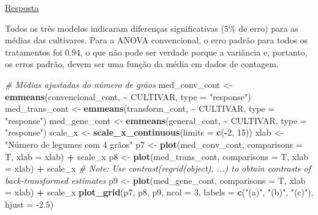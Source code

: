 \documentclass[
]{book}
\newenvironment{Shaded}{\begin{snugshade}}{\end{snugshade}}
\newcommand{\CommentTok}[1]{\textcolor[rgb]{0.56,0.35,0.01}{\textit{#1}}}
\newcommand{\DataTypeTok}[1]{\textcolor[rgb]{0.13,0.29,0.53}{#1}}
\newcommand{\DecValTok}[1]{\textcolor[rgb]{0.00,0.00,0.81}{#1}}
\newcommand{\FloatTok}[1]{\textcolor[rgb]{0.00,0.00,0.81}{#1}}
\newcommand{\KeywordTok}[1]{\textcolor[rgb]{0.13,0.29,0.53}{\textbf{#1}}}
\newcommand{\NormalTok}[1]{#1}
\newcommand{\OperatorTok}[1]{\textcolor[rgb]{0.81,0.36,0.00}{\textbf{#1}}}
\newcommand{\StringTok}[1]{\textcolor[rgb]{0.31,0.60,0.02}{#1}}
\numberwithin{equation}{section}
\newcommand{\indt}[1]{\index{#1|ST}}
\begin{document}
\protect\hyperlink{exerc10}{Resposta}

Todos os três modelos indicaram diferenças significativas (5\% de erro) para as médias das cultivares. Para a ANOVA\indt{ANOVA} convencional, o erro padrão para todos os tratamentos foi 0.94, o que não pode ser verdade porque a variância e, portanto, os erros padrão, devem ser uma função da média em dados de contagem.

\begin{Shaded}
\begin{Highlighting}[]

\CommentTok{\# Médias ajustadas do número de grãos}
\NormalTok{med\_conv\_cont \textless{}{-}}\StringTok{ }\KeywordTok{emmeans}\NormalTok{(convencional\_cont, }\OperatorTok{\textasciitilde{}}\StringTok{ }\NormalTok{CULTIVAR, }\DataTypeTok{type =} \StringTok{"response"}\NormalTok{)}
\NormalTok{med\_trans\_cont \textless{}{-}}\StringTok{ }\KeywordTok{emmeans}\NormalTok{(transform\_cont, }\OperatorTok{\textasciitilde{}}\StringTok{ }\NormalTok{CULTIVAR, }\DataTypeTok{type =} \StringTok{"response"}\NormalTok{)}
\NormalTok{med\_gene\_cont \textless{}{-}}\StringTok{ }\KeywordTok{emmeans}\NormalTok{(general\_cont, }\OperatorTok{\textasciitilde{}}\StringTok{ }\NormalTok{CULTIVAR, }\DataTypeTok{type =} \StringTok{"response"}\NormalTok{)}
\NormalTok{scale\_x \textless{}{-}}\StringTok{ }\KeywordTok{scale\_x\_continuous}\NormalTok{(}\DataTypeTok{limits =} \KeywordTok{c}\NormalTok{(}\OperatorTok{{-}}\DecValTok{2}\NormalTok{, }\DecValTok{15}\NormalTok{))}
\NormalTok{xlab \textless{}{-}}\StringTok{ "Número de legumes com 4 grãos"}
\NormalTok{p7 \textless{}{-}}\StringTok{ }\KeywordTok{plot}\NormalTok{(med\_conv\_cont, }\DataTypeTok{comparisons =}\NormalTok{ T, }\DataTypeTok{xlab =}\NormalTok{ xlab) }\OperatorTok{+}\StringTok{ }\NormalTok{scale\_x}
\NormalTok{p8 \textless{}{-}}\StringTok{ }\KeywordTok{plot}\NormalTok{(med\_trans\_cont, }\DataTypeTok{comparisons =}\NormalTok{ T, }\DataTypeTok{xlab =}\NormalTok{ xlab) }\OperatorTok{+}\StringTok{ }\NormalTok{scale\_x}
\CommentTok{\# Note: Use \textquotesingle{}contrast(regrid(object), ...)\textquotesingle{} to obtain contrasts of back{-}transformed estimates}
\NormalTok{p9 \textless{}{-}}\StringTok{ }\KeywordTok{plot}\NormalTok{(med\_gene\_cont, }\DataTypeTok{comparisons =}\NormalTok{ T, }\DataTypeTok{xlab =}\NormalTok{ xlab) }\OperatorTok{+}\StringTok{ }\NormalTok{scale\_x}
\KeywordTok{plot\_grid}\NormalTok{(p7, p8, p9, }\DataTypeTok{ncol =} \DecValTok{3}\NormalTok{, }
          \DataTypeTok{labels =} \KeywordTok{c}\NormalTok{(}\StringTok{"(a)"}\NormalTok{, }\StringTok{"(b)"}\NormalTok{, }\StringTok{"(c)"}\NormalTok{),}
          \DataTypeTok{hjust =} \FloatTok{{-}2.5}\NormalTok{)}
\end{Highlighting}
\end{Shaded}
\end{document}
